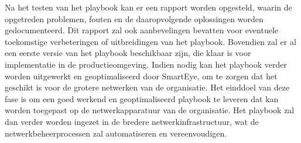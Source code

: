 Na het testen van het playbook kan er een rapport worden opgesteld, waarin de opgetreden problemen, fouten en de daaropvolgende oplossingen worden gedocumenteerd. 
Dit rapport zal ook aanbevelingen bevatten voor eventuele toekomstige verbeteringen of uitbreidingen van het playbook. 
Bovendien zal er al een eerste versie van het playbook beschikbaar zijn, die klaar is voor implementatie in de productieomgeving.
Indien nodig kan het playbook verder worden uitgewerkt en geoptimaliseerd door SmartEye, om te zorgen dat het geschikt is voor de grotere netwerken van de organisatie. 
Het einddoel van deze fase is om een goed werkend en geoptimaliseerd playbook te leveren dat kan worden toegepast op de netwerkapparatuur van de organisatie. 
Het playbook zal dan verder worden ingezet in de bredere netwerkinfrastructuur, wat de netwerkbeheerprocessen zal automatiseren en vereenvoudigen.



